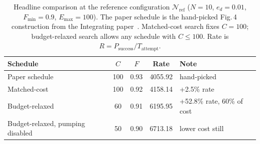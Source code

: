 \begin{table}[ht]
    \centering
    \small
    \begin{tabular}{lcccl}
        \hline
        Schedule & $C$ & $F$ & Rate & Note \\
        \hline
        Paper schedule & 100 & 0.93 & 4055.92 & hand-picked \\
        Matched-cost & 100 & 0.92 & 4158.14 & +2.5\% rate \\
        Budget-relaxed & 60 & 0.91 & 6195.95 & +52.8\% rate, 60\% of cost \\
        Budget-relaxed, pumping disabled & 50 & 0.90 & 6713.18 & lower cost still \\
        \hline
    \end{tabular}

    \caption[Headline schedule comparison at $\mathcal{N}_{\mathrm{ref}}$]{Headline comparison at the reference configuration $\mathcal{N}_{\mathrm{ref}}$ ($N=10$, $e_d=0.01$, $F_{\min}=0.9$, $E_{\max}=100$). The paper schedule is the hand-picked Fig.\,4 construction from the Integrating paper~\cite{Benchasattabuse2025Integrating}. Matched-cost search fixes $C=100$; budget-relaxed search allows any schedule with $C\le100$. Rate is $R=P_{\mathrm{success}}/T_{\mathrm{attempt}}$.}
    \label{tab:headline}
\end{table}